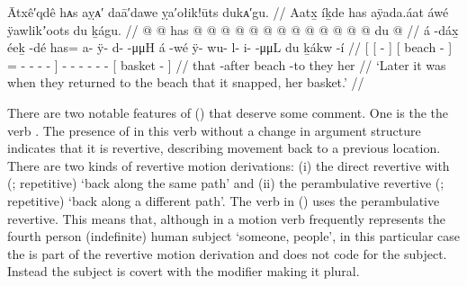 \ex\label{ex:89-7-basket-broke}%
%
\begingl
	\glpreamble	Ātxê′qdê hᴀs aỵᴀ′ daā′dawe ỵa′ołik!ūts dukᴀ′gu. //
	\glpreamble	Aatx̱ íḵde has aÿada.áat áwé ÿawlikʼoots du ḵágu. //
	\gla	{} {}  @ {} {}
			{}  @ {} {}
			has @  @ {} @ {} @ {} @ {} @ {} @ {} {}
		 @ {}
		 @ {} @ {} @ {} @ {} @ {}
		{} du  @ {} {} //
	\glb	{} {} á -dáx̱ {}
			{} éeḵ -dé {}
			has= a- ÿ- {} d-  -μμH {} {}
		á -wé
		ÿ- wu- l- i-  -μμL
		{} du ḵákw -í {} //
	\glc	{}[ {}[  - {}]
			{}[ beach - {}]
			= - - \· -
				 - \· {}]
		 -
		- - - -  -
		{}[  basket - {}] //
	\gld	{} {} that -after {}
			{} beach -to {}
			they  {} {} {} {} {} {} {}
		 {}
		 {} {} {} {} {}
		{} her  {} {} //
	\glft	‘Later it was when they returned to the beach that it snapped, her basket.’
		//
\endgl
\xe

There are two notable features of (\lastx) that deserve some comment.
One is the the verb .
The presence of  in this verb without a change in argument structure indicates that it is revertive, describing movement back to a previous location.
There are two kinds of revertive motion derivations: (i) the direct revertive with  (;  repetitive) ‘back along the same path’ and (ii) the perambulative revertive  (;  repetitive) ‘back along a different path’.
The verb  in (\lastx) uses the perambulative revertive.
This means that, although  in a motion verb frequently represents the fourth person (indefinite) human subject ‘someone, people’, in this particular case the  is part of the revertive motion derivation and does not code for the subject.
Instead the subject is covert with the modifier  making it plural.

